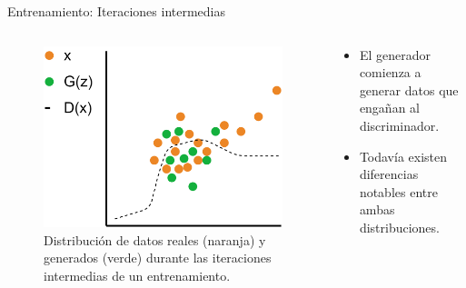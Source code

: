 \begin{frame}{Entrenamiento: Iteraciones intermedias}

    \begin{columns}[T]
    \begin{column}{.48\textwidth}
    
    \begin{figure}
        \centering
        \includegraphics[width=\textwidth]{Slides/figures/GAN/Entreno distribucion 2.png}
        \caption{Distribución de datos reales (naranja) y generados (verde) durante las iteraciones intermedias de un entrenamiento.}
    \end{figure}
    
    \end{column}
    \hfill
    \begin{column}{.48\textwidth}
    
    \begin{itemize}
        \item El generador comienza a generar datos que \alert{engañan} al discriminador.
        \item Todavía existen \alert{diferencias notables} entre ambas distribuciones.
    \end{itemize}

    \end{column}
    \end{columns}
    
\end{frame}

